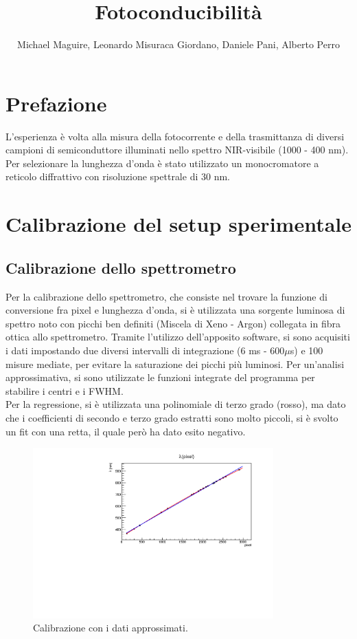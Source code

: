 \documentclass[11pt]{article} %
\title{Fotoconducibilità}
\author{Michael Maguire, Leonardo Misuraca Giordano, Daniele Pani, Alberto Perro}
\begin{document}
\maketitle
\newpage
\section*{Prefazione}
L'esperienza è volta alla misura della fotocorrente e della trasmittanza di diversi campioni di semiconduttore illuminati nello spettro NIR-visibile (1000 - 400 nm). Per selezionare la lunghezza d'onda è stato utilizzato un monocromatore a reticolo diffrattivo con risoluzione spettrale di 30 nm.
\section{Calibrazione del setup sperimentale}
\subsection{Calibrazione dello spettrometro}
Per la calibrazione dello spettrometro, che consiste nel trovare la funzione di conversione fra pixel e lunghezza d'onda, si è utilizzata una sorgente luminosa di spettro noto con picchi ben definiti (Miscela di Xeno - Argon) collegata in fibra ottica allo spettrometro.
Tramite l'utilizzo dell'apposito software, si sono acquisiti i dati impostando due diversi intervalli di integrazione (6 ms - 600$\mu$s) e 100 misure mediate, per evitare la saturazione dei picchi più luminosi. Per un'analisi approssimativa, si sono utilizzate le funzioni integrate del programma per stabilire i centri e i FWHM.\\Per la regressione, si è utilizzata una polinomiale di terzo grado (rosso), ma dato che i coefficienti di secondo e terzo grado estratti sono molto piccoli, si è svolto un fit con una retta, il quale però ha dato esito negativo.
\begin{figure}[h!]
\begin{center}
\includegraphics[width=350px]{img/cal_approx.pdf}
\caption{Calibrazione con i dati approssimati.}
\end{center}
\end{figure}
\end{document}
